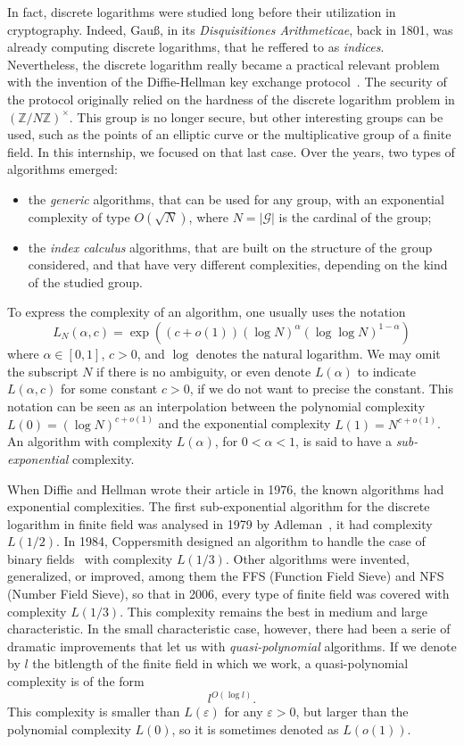 \documentclass[a4paper,11pt]{article}
\theoremstyle{break}
\theoremstyle{sc}
\theoremstyle{definition}
\theoremstyle{remark}
\begin{document}
In fact, discrete
logarithms were studied long before their utilization in cryptography. Indeed,
Gauß, in its \emph{Disquisitiones Arithmeticae}, back in 1801, was already
computing discrete logarithms, that he reffered to as \emph{indices}.
Nevertheless, the discrete logarithm really became a practical relevant problem
with the invention of the Diffie-Hellman key exchange protocol~\cite{DH76}. The
security of the protocol originally relied on the hardness of the discrete
logarithm problem in $(\mathbb{Z}/N\mathbb{Z})^\times$. This group is no longer
secure, but other interesting groups can be used, such as the points of an
elliptic curve or the multiplicative group of a finite field. In this
internship, we focused on that last case. Over the years, two
types of algorithms emerged:
\begin{itemize}
  \item the \emph{generic} algorithms, that can be used for any group, with an
    exponential complexity of type $O(\sqrt N)$, where $N=|\mathcal G|$ is the cardinal
    of the group;
  \item the \emph{index calculus} algorithms, that are built on the structure of
    the group considered, and that have very different complexities, depending
    on the kind of the studied group.
\end{itemize}

To express the complexity of an algorithm, one usually uses the notation
\[
  L_N(\alpha, c) = \exp((c+o(1))(\log N)^\alpha(\log\log N)^{1-\alpha})
\]
where $\alpha\in[0, 1]$, $c>0$, and $\log$ denotes the natural logarithm. We may
omit the subscript $N$ if there is no ambiguity, or even denote
$L(\alpha)$ to indicate $L(\alpha, c)$ for some constant $c>0$, if we do not
want to precise the constant. This notation can be seen as an interpolation
between the polynomial complexity $L(0)=(\log N)^{c+o(1)}$ and the exponential
complexity $L(1)=N^{c+o(1)}$. An algorithm with complexity $L(\alpha)$, for
$0<\alpha<1$, is said to have a \emph{sub-exponential} complexity.

When Diffie and Hellman wrote their article in 1976, the known algorithms
had exponential complexities. The first sub-exponential algorithm for the
discrete logarithm in finite field was analysed
in 1979 by Adleman~\cite{Adleman79}, it had complexity $L(1/2)$. In 1984, 
Coppersmith designed
an algorithm to handle the case of binary fields~\cite{Coppersmith84} with 
complexity $L(1/3)$. Other
algorithms were invented, generalized, or improved, among them the FFS
(Function Field Sieve) and NFS (Number Field Sieve), so that in 2006, every type
of finite field was covered with complexity $L(1/3)$. This complexity remains
the best in medium and large characteristic. In the small
characteristic case, however, there had been a serie of dramatic
improvements that let us with \emph{quasi-polynomial} algorithms. If we denote
by $l$ the bitlength of the finite field in which we work, a quasi-polynomial
complexity is of the form
\[
  l^{O(\log l)}.
\]
This complexity is smaller than $L(\varepsilon)$ for any
$\varepsilon>0$, but larger than the polynomial complexity $L(0)$, so it
is sometimes denoted as $L(o(1))$.
\end{document}

